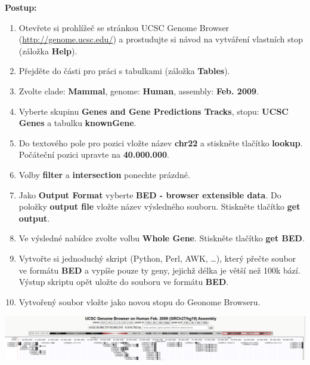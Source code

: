 \documentclass[11pt]{article}
\begin{document}
\textbf{Postup:}
\begin{enumerate}
\item Otevřete si prohlížeč se stránkou UCSC Genome Browser
(\url{http://genome.ucsc.edu/}) a prostudujte si návod na vytváření vlastních stop
(záložka \textbf{Help}).
\item Přejděte do části pro práci s tabulkami (záložka \textbf{Tables}).
\item Zvolte clade: \textbf{Mammal}, genome: \textbf{Human}, assembly: \textbf{Feb. 2009}.
\item Vyberte skupinu \textbf{Genes and Gene Predictions Tracks}, stopu: \textbf{UCSC Genes} a
tabulku \textbf{knownGene}.
\item Do textového pole pro pozici vložte název \textbf{chr22} a stiskněte tlačítko
\textbf{lookup}. Počáteční pozici upravte na \textbf{40.000.000}.
\item Volby \textbf{filter} a \textbf{intersection} ponechte prázdné.
\item Jako \textbf{Output Format} vyberte \textbf{BED - browser extensible data}. Do položky \textbf{output
file} vložte název výsledného souboru. Stiskněte tlačítko \textbf{get output}.
\item Ve výsledné nabídce zvolte volbu \textbf{Whole Gene}. Stiskněte tlačítko \textbf{get BED}.
\item Vytvořte si jednoduchý skript (Python, Perl, AWK, \ldots{}), který přečte soubor
ve formátu \textbf{BED} a vypíše pouze ty geny, jejichž délka je větší než 100k
bází. Výstup skriptu opět uložte do souboru ve formátu \textbf{BED}.
\item Vytvořený soubor vložte jako novou stopu do Geonome Browseru.
\end{enumerate}

\begin{center}
\includegraphics[width=1.2\linewidth]{./bif-3-custom.png}
\end{center}
\end{document}
